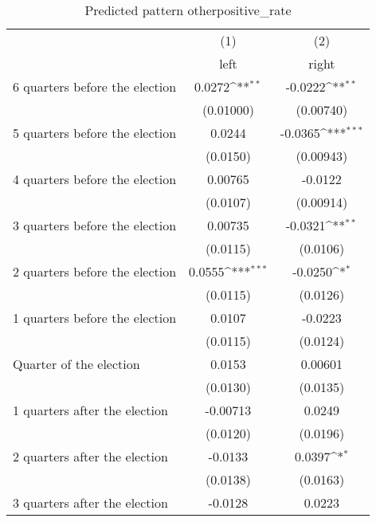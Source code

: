 \begin{table}[htbp]\centering
\def\sym#1{\ifmmode^{#1}\else\(^{#1}\)\fi}
\caption{Predicted pattern otherpositive\_rate}
\begin{tabular}{l*{2}{c}}
\hline\hline
                    &\multicolumn{1}{c}{(1)}&\multicolumn{1}{c}{(2)}\\
                    &\multicolumn{1}{c}{left}&\multicolumn{1}{c}{right}\\
\hline
 6 quarters before the election&      0.0272\sym{**} &     -0.0222\sym{**} \\
                    &   (0.01000)         &   (0.00740)         \\
[1em]
 5 quarters before the election&      0.0244         &     -0.0365\sym{***}\\
                    &    (0.0150)         &   (0.00943)         \\
[1em]
 4 quarters before the election&     0.00765         &     -0.0122         \\
                    &    (0.0107)         &   (0.00914)         \\
[1em]
 3 quarters before the election&     0.00735         &     -0.0321\sym{**} \\
                    &    (0.0115)         &    (0.0106)         \\
[1em]
 2 quarters before the election&      0.0555\sym{***}&     -0.0250\sym{*}  \\
                    &    (0.0115)         &    (0.0126)         \\
[1em]
 1 quarters before the election&      0.0107         &     -0.0223         \\
                    &    (0.0115)         &    (0.0124)         \\
[1em]
Quarter of the election&      0.0153         &     0.00601         \\
                    &    (0.0130)         &    (0.0135)         \\
[1em]
 1 quarters after the election&    -0.00713         &      0.0249         \\
                    &    (0.0120)         &    (0.0196)         \\
[1em]
 2 quarters after the election&     -0.0133         &      0.0397\sym{*}  \\
                    &    (0.0138)         &    (0.0163)         \\
[1em]
 3 quarters after the election&     -0.0128         &      0.0223         \\

\end{tabular}
\end{table}
